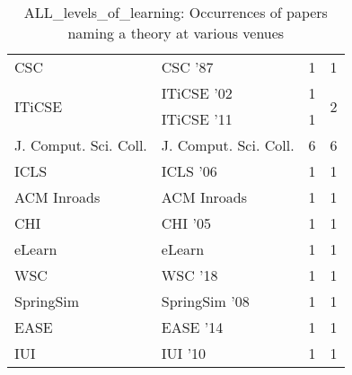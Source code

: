 \begin{table*}[t]
\begin{tabular}{llrr}
\multirow{1}{*}{CSC } & CSC '87 & 1 & \multirow{1}{*}{1}\\
\multirow{2}{*}{ITiCSE } & ITiCSE '02 & 1 & \multirow{2}{*}{2}\\
& ITiCSE '11 & 1 &\\
\multirow{1}{*}{J. Comput. Sci. Coll.} & J. Comput. Sci. Coll. & 6 & \multirow{1}{*}{6}\\
\multirow{1}{*}{ICLS } & ICLS '06 & 1 & \multirow{1}{*}{1}\\
\multirow{1}{*}{ACM Inroads} & ACM Inroads & 1 & \multirow{1}{*}{1}\\
\multirow{1}{*}{CHI } & CHI '05 & 1 & \multirow{1}{*}{1}\\
\multirow{1}{*}{eLearn} & eLearn & 1 & \multirow{1}{*}{1}\\
\multirow{1}{*}{WSC } & WSC '18 & 1 & \multirow{1}{*}{1}\\
\multirow{1}{*}{SpringSim } & SpringSim '08 & 1 & \multirow{1}{*}{1}\\
\multirow{1}{*}{EASE } & EASE '14 & 1 & \multirow{1}{*}{1}\\
\multirow{1}{*}{IUI } & IUI '10 & 1 & \multirow{1}{*}{1}\\
\end{tabular}
\caption{ALL\_levels\_of\_learning: Occurrences of papers naming a theory at various venues}
\end{table*}
